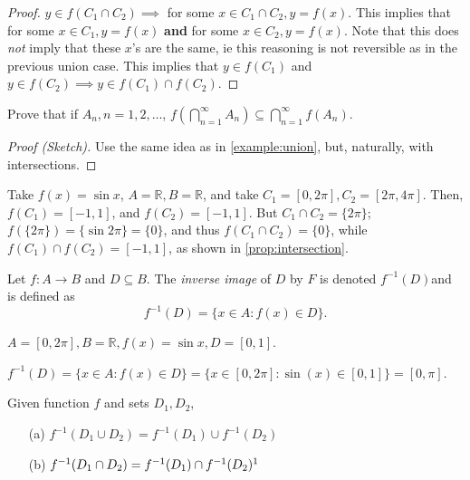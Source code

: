 \documentclass[12pt]{article}
\begin{document}
\begin{proof}
  $y \in f(C_1 \cap C_2) \implies$ for some $x \in C_1 \cap C_2, y = f(x)$. This implies that for some $x \in C_1, y = f(x)$ \textbf{and} for some $x \in C_2, y = f(x)$. Note that this does \textit{not} imply that these $x$'s are the same, ie this reasoning is not reversible as in the previous union case. This implies that $y \in f(C_1)$ and $y \in f(C_2) \implies y \in f(C_1) \cap f(C_2)$.
\end{proof}

\begin{example}
  Prove that if $A_n, n = 1, 2, \dots$, $f(\bigcap_{n=1}^{\infty} A_n) \subseteq \bigcap_{n=1}^{\infty}f(A_n)$.
  \begin{proof}[Proof (Sketch)]
    Use the same idea as in \cref{example:union}, but, naturally, with intersections.
  \end{proof}
\end{example}

\begin{example}
  Take $f(x) = \sin x$, $A = \mathbb{R}, B = \mathbb{R}$, and take $C_1 = [0, 2 \pi], C_2 = [2 \pi, 4 \pi]$. Then, $f(C_1) = [-1,1]$, and $f(C_2) = [-1,1]$. But $C_1 \cap C_2 = \{2 \pi\}$; $f(\{2 \pi\}) = \{\sin 2 \pi\} = \{0\}$, and thus $f(C_1 \cap C_2) = \{0\}$, while $f(C_1) \cap f(C_2) = [-1,1]$, as shown in \cref{prop:intersection}.
\end{example}

\begin{definition}
  Let $f: A \to B$ and $D \subseteq B$. The \emph{inverse image} of $D$ by $F$ is denoted $f^{-1}(D)$\footnotemark and is defined as \[f^{-1}(D) = \{x \in A : f(x) \in D\}.\]
\end{definition}
\begin{example}
  $A = [0, 2 \pi], B = \mathbb{R}, f(x) = \sin x, D = [0,1]$. 
  
  $f^{-1}(D) = \{x \in A: f(x) \in D\} = \{x \in [0, 2 \pi] : \sin(x) \in [0,1]\} = [0,\pi]$.
\end{example}

\begin{proposition}\label{prop:intersectionsimple}
  Given function $f$ and sets $D_1, D_2$,
  \begin{itemize}
    \item[(a)] $f^{-1}(D_1 \cup D_2) = f^{-1}(D_1) \cup f^{-1}(D_2)$
    \item[(b)] $f^{-1}(D_1 \cap D_2) = f^{-1}(D_1) \cap f^{-1}(D_2)\footnotemark$ 
  \end{itemize}
\end{proposition}
\end{document}

